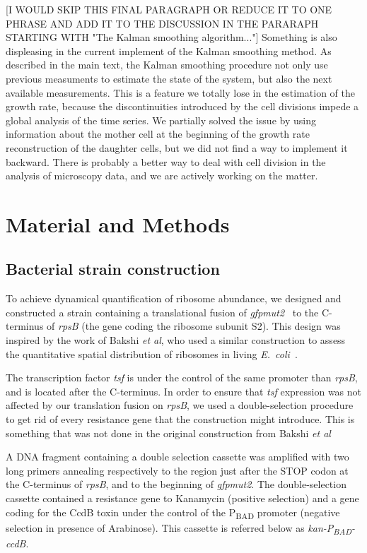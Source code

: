 [I WOULD SKIP THIS FINAL PARAGRAPH OR REDUCE IT TO ONE PHRASE AND ADD IT TO THE DISCUSSION IN THE PARARAPH STARTING WITH "The Kalman smoothing algorithm..."]
Something is also displeasing in the current implement of the Kalman smoothing method.
As described in the main text, the Kalman smoothing procedure not only use previous measuments to estimate the state of the system, but also the next available measurements.
This is a feature we totally lose in the estimation of the growth rate, because the discontinuities introduced by the cell divisions impede a global analysis of the time series.
We partially solved the issue by using information about the mother cell at the beginning of the growth rate reconstruction of the daughter cells, but we did not find a way to implement it backward.
There is probably a better way to deal with cell division in the analysis of microscopy data, and we are actively working on the matter.

\section{Material and Methods}

\subsection{Bacterial strain construction}
\label{sec:methods_strain}

To achieve dynamical quantification of ribosome abundance, we designed and constructed a strain containing a translational fusion of \textit{gfpmut2}~\cite{zaslaver_comprehensive_2006} to the C-terminus of \textit{rpsB} (the gene coding the ribosome subunit S2).
This design was inspired by the work of Bakshi \textit{et al}, who used a similar construction to assess the quantitative spatial distribution of ribosomes in living \textit{E.~coli}~\cite{bakshi_superresolution_2012}.

The transcription factor \textit{tsf} is under the control of the same promoter than \textit{rpsB}, and is located after the C-terminus.
In order to ensure that \textit{tsf} expression was not affected by our translation fusion on \textit{rpsB}, we used a double-selection procedure to get rid of every resistance gene that the construction might introduce.
This is something that was not done in the original construction from Bakshi \textit{et al}~\cite{bakshi_superresolution_2012}

A DNA fragment containing a double selection cassette was amplified with two long primers annealing respectively to the region just after the STOP codon at the C-terminus of \textit{rpsB}, and to the beginning of \textit{gfpmut2}.
The double-selection cassette contained a resistance gene to Kanamycin (positive selection) and a gene coding for the CcdB toxin under the control of the P\textsubscript{BAD} promoter (negative selection in presence of Arabinose).
This cassette is referred below as \textit{kan-P\textsubscript{BAD}-ccdB}.

